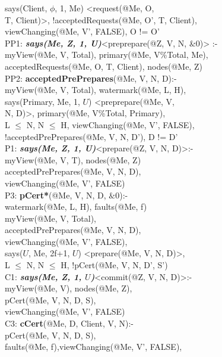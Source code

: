 \begin{code}
\> says(Client, $\phi$, 1, Me) <request(@Me, O, \\
\> T, Client)>, !acceptedRequests(@Me, O', T, Client),\\
\> viewChanging(@Me, V', FALSE), O != O'\\
PP1: \textbf{\em says(Me, Z, 1, U)}<preprepare(@Z, V, N, \&0)> :- \\
\> myView(@Me, V, Total), primary(@Me, V\%Total, Me),\\
\> acceptedRequests(@Me, O, T, Client), nodes(@Me, Z)\\
PP2: \textbf{acceptedPrePrepares}(@Me, V, N, D):-\\
\> myView(@Me, V, Total), watermark(@Me, L, H), \\
\> says(Primary, Me, 1, $U$) <preprepare(@Me, V,\\
\>  N, D)>, primary(@Me, V\%Total, Primary),\\
\> L $\leq$ N, N $\leq$ H, viewChanging(@Me, V', FALSE),\\
\> !acceptedPrePrepares(@Me, V, N, D'), D != D'\\
P1: \textbf{\textit{says(Me, Z, 1, U)}}<prepare(@Z, V, N, D)>:-\\
\> myView(@Me, V, T), nodes(@Me, Z)\\
\> acceptedPrePrepares(@Me, V, N, D),\\
\> viewChanging(@Me, V', FALSE)\\
P3: \textbf{pCert*}(@Me, V, N, D, $\&0$):- \\
\> watermark(@Me, L, H), faults(@Me, f)\\
\> myView(@Me, V, Total), \\
\> acceptedPrePrepares(@Me, V, N, D), \\
\> viewChanging(@Me, V', FALSE),\\
\> says($U$, Me, 2f+1, $U$) <prepare(@Me, V, N, D)>, \\
\> L $\leq$ N, N $\leq$ H, !pCert(@Me, V, N, D', S')\\
C1: \textbf{\textit{says(Me, Z, 1, $U$)}}<commit(@Z, V, N, D)>:- \\
\> myView(@Me, V), nodes(@Me, Z), \\
\> pCert(@Me, V, N, D, S), \\
\> viewChanging(@Me, V', FALSE)\\
C3: \textbf{cCert}(@Me, D, Client, V, N):-\\
\> pCert(@Me, V, N, D, S), \\
\> faults(@Me, f),viewChanging(@Me, V', FALSE), \\

\end{code}
